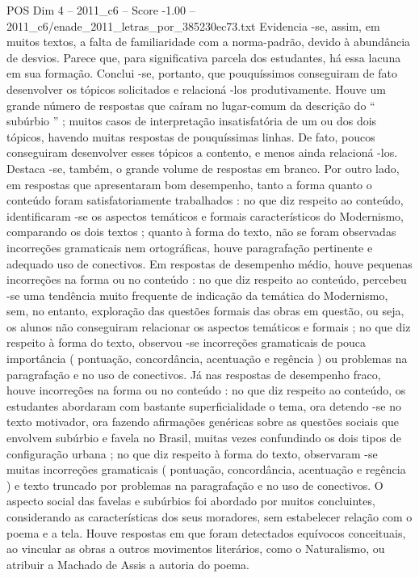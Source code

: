 \begin{textsample}{POS Dim 4 – 2011\_c6 – Score -1.00 – 2011\_c6/enade\_2011\_letras\_por\_385230ec73.txt}
Evidencia -se, assim, em muitos textos, a falta de familiaridade com a norma-padrão, devido à abundância de desvios.
Parece que, para significativa parcela dos estudantes, há essa lacuna em sua formação.
Conclui -se, portanto, que pouquíssimos conseguiram de fato desenvolver os tópicos solicitados e relacioná -los produtivamente.
Houve um grande número de respostas que caíram no lugar-comum da descrição do “ subúrbio ” ; muitos casos de interpretação insatisfatória de um ou dos dois tópicos, havendo muitas respostas de pouquíssimas linhas.
De fato, poucos conseguiram desenvolver esses tópicos a contento, e menos ainda relacioná -los.
Destaca -se, também, o grande volume de respostas em branco.
Por outro lado, em respostas que apresentaram bom desempenho, tanto a forma quanto o conteúdo foram satisfatoriamente trabalhados : no que diz respeito ao conteúdo, identificaram -se os aspectos temáticos e formais característicos do Modernismo, comparando os dois textos ; quanto à forma do texto, não se foram observadas incorreções gramaticais nem ortográficas, houve paragrafação pertinente e adequado uso de conectivos.
Em respostas de desempenho médio, houve pequenas incorreções na forma ou no conteúdo : no que diz respeito ao conteúdo, percebeu -se uma tendência muito frequente de indicação da temática do Modernismo, sem, no entanto, exploração das questões formais das obras em questão, ou seja, os alunos não conseguiram relacionar os aspectos temáticos e formais ; no que diz respeito à forma do texto, observou -se incorreções gramaticais de pouca importância ( pontuação, concordância, acentuação e regência ) ou problemas na paragrafação e no uso de conectivos.
Já nas respostas de desempenho fraco, houve incorreções na forma ou no conteúdo : no que diz respeito ao conteúdo, os estudantes abordaram com bastante superficialidade o tema, ora detendo -se no texto motivador, ora fazendo afirmações genéricas sobre as questões sociais que envolvem subúrbio e favela no Brasil, muitas vezes confundindo os dois tipos de configuração urbana ; no que diz respeito à forma do texto, observaram -se muitas incorreções gramaticais ( pontuação, concordância, acentuação e regência ) e texto truncado por problemas na paragrafação e no uso de conectivos.
O aspecto social das favelas e subúrbios foi abordado por muitos concluintes, considerando as características dos seus moradores, sem estabelecer relação com o poema e a tela.
Houve respostas em que foram detectados equívocos conceituais, ao vincular as obras a outros movimentos literários, como o Naturalismo, ou atribuir a Machado de Assis a autoria do poema.

\end{textsample}
